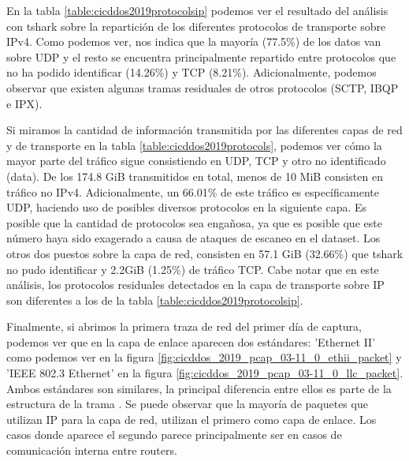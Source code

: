 En la tabla \ref{table:cicddos2019protocolsip} podemos ver el resultado del análisis con tshark sobre la repartición de los diferentes protocolos de transporte sobre IPv4. Como podemos ver, nos indica que la mayoría (77.5\%) de los datos van sobre UDP y el resto se encuentra principalmente repartido entre protocolos que no ha podido identificar (14.26\%) y TCP (8.21\%). Adicionalmente, podemos observar que existen algunas tramas residuales de otros protocolos (SCTP, IBQP e IPX).



Si miramos la cantidad de información transmitida por las diferentes capas de red y de transporte en la tabla \ref{table:cicddos2019protocols}, podemos ver cómo la mayor parte del tráfico sigue consistiendo en UDP, TCP y otro no identificado (data). De los 174.8 GiB transmitidos en total, menos de 10 MiB consisten en tráfico no IPv4. Adicionalmente, un 66.01\% de este tráfico es específicamente UDP, haciendo uso de posibles diversos protocolos en la siguiente capa. Es posible que la cantidad de protocolos sea engañosa, ya que es posible que este número haya sido exagerado a causa de ataques de escaneo en el dataset. Los otros dos puestos sobre la capa de red, consisten en 57.1 GiB (32.66\%) que tshark no pudo identificar y 2.2GiB (1.25\%) de tráfico TCP. Cabe notar que en este análisis, los protocolos residuales detectados en la capa de transporte sobre IP son diferentes a los de la tabla \ref{table:cicddos2019protocolsip}.



Finalmente, si abrimos la primera traza de red del primer día de captura, podemos ver que en la capa de enlace aparecen dos estándares: 'Ethernet II' como podemos ver en la figura \ref{fig:cicddos_2019_pcap_03-11_0_ethii_packet} y 'IEEE 802.3 Ethernet' en la figura \ref{fig:cicddos_2019_pcap_03-11_0_llc_packet}. Ambos estándares son similares, la principal diferencia entre ellos es parte de la estructura de la trama \cite{IBMeth2vsllc}. Se puede observar que la mayoría de paquetes que utilizan IP para la capa de red, utilizan el primero como capa de enlace. Los casos donde aparece el segundo parece principalmente ser en casos de comunicación interna entre routers.

